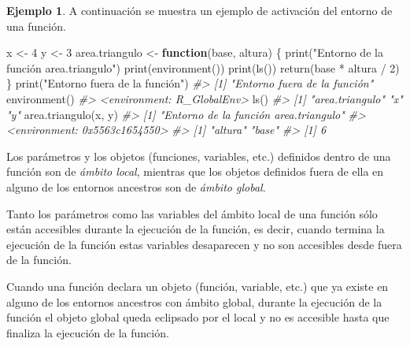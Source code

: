 \documentclass[
]{book}
\newenvironment{Shaded}{\begin{snugshade}}{\end{snugshade}}
\newcommand{\CommentTok}[1]{\textcolor[rgb]{0.56,0.35,0.01}{\textit{#1}}}
\newcommand{\ControlFlowTok}[1]{\textcolor[rgb]{0.13,0.29,0.53}{\textbf{#1}}}
\newcommand{\DecValTok}[1]{\textcolor[rgb]{0.00,0.00,0.81}{#1}}
\newcommand{\FunctionTok}[1]{\textcolor[rgb]{0.00,0.00,0.00}{#1}}
\newcommand{\NormalTok}[1]{#1}
\newcommand{\OtherTok}[1]{\textcolor[rgb]{0.56,0.35,0.01}{#1}}
\newcommand{\SpecialCharTok}[1]{\textcolor[rgb]{0.00,0.00,0.00}{#1}}
\newcommand{\StringTok}[1]{\textcolor[rgb]{0.31,0.60,0.02}{#1}}
\theoremstyle{definition}
\theoremstyle{definition}
\newtheorem{example}{Ejemplo}[chapter]
\theoremstyle{definition}
\theoremstyle{definition}
\theoremstyle{remark}
\begin{document}
\begin{example}

A continuación se muestra un ejemplo de activación del entorno de una función.

\begin{Shaded}
\begin{Highlighting}[]
\NormalTok{x }\OtherTok{\textless{}{-}} \DecValTok{4}
\NormalTok{y }\OtherTok{\textless{}{-}} \DecValTok{3}
\NormalTok{area.triangulo }\OtherTok{\textless{}{-}} \ControlFlowTok{function}\NormalTok{(base, altura) \{}
  \FunctionTok{print}\NormalTok{(}\StringTok{"Entorno de la función area.triangulo"}\NormalTok{) }
  \FunctionTok{print}\NormalTok{(}\FunctionTok{environment}\NormalTok{())}
  \FunctionTok{print}\NormalTok{(}\FunctionTok{ls}\NormalTok{())}
  \FunctionTok{return}\NormalTok{(base }\SpecialCharTok{*}\NormalTok{ altura }\SpecialCharTok{/} \DecValTok{2}\NormalTok{)}
\NormalTok{\}}
\FunctionTok{print}\NormalTok{(}\StringTok{"Entorno fuera de la función"}\NormalTok{)}
\CommentTok{\#\textgreater{} [1] "Entorno fuera de la función"}
\FunctionTok{environment}\NormalTok{()}
\CommentTok{\#\textgreater{} \textless{}environment: R\_GlobalEnv\textgreater{}}
\FunctionTok{ls}\NormalTok{()}
\CommentTok{\#\textgreater{} [1] "area.triangulo" "x"              "y"}
\FunctionTok{area.triangulo}\NormalTok{(x, y)}
\CommentTok{\#\textgreater{} [1] "Entorno de la función area.triangulo"}
\CommentTok{\#\textgreater{} \textless{}environment: 0x5563c1654550\textgreater{}}
\CommentTok{\#\textgreater{} [1] "altura" "base"}
\CommentTok{\#\textgreater{} [1] 6}
\end{Highlighting}
\end{Shaded}

\end{example}

Los parámetros y los objetos (funciones, variables, etc.) definidos dentro de una función son de \emph{ámbito local}, mientras que los objetos definidos fuera de ella en alguno de los entornos ancestros son de \emph{ámbito global}.

Tanto los parámetros como las variables del ámbito local de una función sólo están accesibles durante la ejecución de la función, es decir, cuando termina la ejecución de la función estas variables desaparecen y no son accesibles desde fuera de la función.

Cuando una función declara un objeto (función, variable, etc.) que ya existe en alguno de los entornos ancestros con ámbito global, durante la ejecución de la función el objeto global queda eclipsado por el local y no es accesible hasta que finaliza la ejecución de la función.
\end{document}
